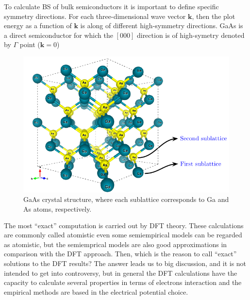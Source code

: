 To calculate \gls{BS} of bulk semiconductors it is important to define specific symmetry directions. For each three-dimensional wave vector $\boldsymbol{k}$, then the plot energy as a function of $\boldsymbol{k}$ is along of different high-symmetry directions\cite{piprek2017handbook}.  GaAs is a direct semiconductor for which the $\left[000\right]$ direction is of high-symetry denoted by $\Gamma$ point ($\boldsymbol{k}=0$)
\begin{figure}[h!]
	\centering
	\includegraphics[width=\linewidth]{../figures/chapter-1/bulk-1/build/bulk-1}
	\caption{
		 GaAs crystal structure, where each sublattice corresponds to Ga and As atoms, respectively. }
	\label{fig:subsubsection-1.1.1-bulk-1}
\end{figure}

The most ``exact'' computation is carried out by DFT theory. These calculations are  commonly  called atomistic even some  semiempirical models can be regarded as atomistic, but the semiemprical models are also good approximations in comparison with the DFT approach. Then, which is the reason to call ``exact'' solutions to the DFT results? The answer leads us to big discussion, and it is not intended to get into controversy,  but in general the DFT calculations have the capacity to calculate several properties in terms of electrons interaction and the empirical methods are based in the electrical potential choice.\\
 
